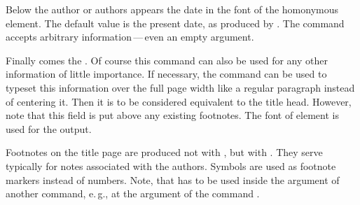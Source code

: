 \BeginIndexGroup
{}%
Below the author or authors appears the
date in the font of the homonymous element. The default value is
the present date, as produced by . The
 command accepts arbitrary information\,---\,even an empty
argument.%
\EndIndexGroup

\BeginIndexGroup
{}%
Finally comes the
. Of course this command can also
be used for any other information of little importance. If necessary, the
 command can be used to typeset this information over the full
page width like a regular paragraph instead of centering it.  Then it is to be
considered equivalent to the title head. However, note that this field is put
above any existing footnotes. The font of element  is
used for the output.%
\EndIndexGroup

Footnotes on the title page are
produced not with , but with . They serve
typically for notes associated with the authors. Symbols are used as footnote
markers instead of numbers. Note, that  has
to be used inside the argument of another command, e.\,g., at the argument
 of the command .

